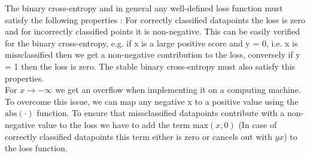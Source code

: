 \documentclass[11pt]{article}
\begin{document}
\noindent The binary cross-entropy and in general any well-defined loss function must satisfy the following properties : For correctly classified datapoints the loss is zero and for incorrectly classified points it is non-negative. This can be easily verified for the binary cross-entropy, e.g. if x is a large positive score and y = 0, i.e. x is missclassified then we get a non-negative contribution to the loss, conversely if y = 1 then the loss is zero. The stable binary cross-entropy must also satisfy this properties.
\\
\noindent For $x \rightarrow -\infty$ we get an overflow  when implementing it on a computing machine. To overcome this issue, we can map any negative x to a positive value using the $\text{abs}(\cdot)$ function. To ensure that missclassified datapoints contribute with a non-negative value to the loss we have to add the term $\text{max}(x, 0)$ (In case of correctly classified datapoints this term either is zero or cancels out with $yx$) to the loss function.
\end{document}
